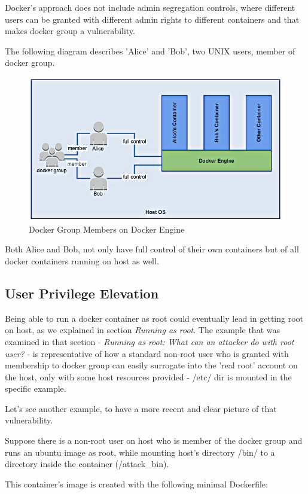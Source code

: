 Docker's approach does not include admin segregation controls, where different users can be granted with different admin rights to different containers and that makes docker group a vulnerability.

The following diagram describes 'Alice' and 'Bob', two UNIX users, member of docker group.

\begin{figure}[h!]
  \centering
   \includegraphics[width=0.85\linewidth]{./figures/dockergroupgm.png}
   \caption{Docker Group Members on Docker Engine}
\end{figure}

Both Alice and Bob, not only have full control of their own containers but of all docker containers running on host as well.

\subsection{User Privilege Elevation}
Being able to run a docker container as root could eventually lead in getting root on host, as we explained in section \textit{Running as root}. The example that was examined in that section - \textit{Running as root: What can an attacker do with root user?} - is representative of how a standard non-root user who is granted with membership to docker group can easily surrogate into the 'real root' account on the host, only with some host resources provided - /etc/ dir is mounted in the specific example.

Let's see another example, to have a more recent and clear picture of that vulnerability.

Suppose there is a non-root user on host who is member of the docker group and runs an ubuntu image as root, while mounting host's directory /bin/ to a directory inside the container (/attack\_bin). 

This container's image is created with the following minimal Dockerfile:

